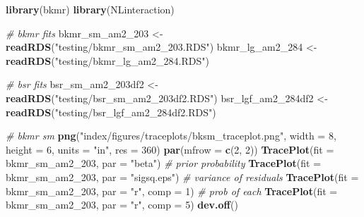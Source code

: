 \documentclass[12pt, twoside]{amherstthesis}
\newenvironment{Shaded}{\begin{snugshade}}{\end{snugshade}}
\newcommand{\AttributeTok}[1]{\textcolor[rgb]{0.13,0.29,0.53}{#1}}
\newcommand{\CommentTok}[1]{\textcolor[rgb]{0.56,0.35,0.01}{\textit{#1}}}
\newcommand{\DecValTok}[1]{\textcolor[rgb]{0.00,0.00,0.81}{#1}}
\newcommand{\FunctionTok}[1]{\textcolor[rgb]{0.13,0.29,0.53}{\textbf{#1}}}
\newcommand{\NormalTok}[1]{#1}
\newcommand{\OtherTok}[1]{\textcolor[rgb]{0.56,0.35,0.01}{#1}}
\newcommand{\StringTok}[1]{\textcolor[rgb]{0.31,0.60,0.02}{#1}}
\begin{document}
\scriptsize
\begin{Shaded}
\begin{Highlighting}[]
\FunctionTok{library}\NormalTok{(bkmr)}
\FunctionTok{library}\NormalTok{(NLinteraction)}

\CommentTok{\# bkmr fits}
\NormalTok{bkmr\_sm\_am2\_203 }\OtherTok{\textless{}{-}} \FunctionTok{readRDS}\NormalTok{(}\StringTok{"testing/bkmr\_sm\_am2\_203.RDS"}\NormalTok{)}
\NormalTok{bkmr\_lg\_am2\_284 }\OtherTok{\textless{}{-}} \FunctionTok{readRDS}\NormalTok{(}\StringTok{"testing/bkmr\_lg\_am2\_284.RDS"}\NormalTok{)}

\CommentTok{\# bsr fits}
\NormalTok{bsr\_sm\_am2\_203df2 }\OtherTok{\textless{}{-}} \FunctionTok{readRDS}\NormalTok{(}\StringTok{"testing/bsr\_sm\_am2\_203df2.RDS"}\NormalTok{)}
\NormalTok{bsr\_lgf\_am2\_284df2 }\OtherTok{\textless{}{-}} \FunctionTok{readRDS}\NormalTok{(}\StringTok{"testing/bsr\_lgf\_am2\_284df2.RDS"}\NormalTok{)}

\CommentTok{\# bkmr sm}
\FunctionTok{png}\NormalTok{(}\StringTok{"index/figures/traceplots/bksm\_traceplot.png"}\NormalTok{, }\AttributeTok{width =} \DecValTok{8}\NormalTok{, }\AttributeTok{height =} \DecValTok{6}\NormalTok{, }\AttributeTok{units =} \StringTok{"in"}\NormalTok{, }\AttributeTok{res =} \DecValTok{360}\NormalTok{)}
\FunctionTok{par}\NormalTok{(}\AttributeTok{mfrow =} \FunctionTok{c}\NormalTok{(}\DecValTok{2}\NormalTok{, }\DecValTok{2}\NormalTok{))}
\FunctionTok{TracePlot}\NormalTok{(}\AttributeTok{fit =}\NormalTok{ bkmr\_sm\_am2\_203, }\AttributeTok{par =} \StringTok{"beta"}\NormalTok{) }\CommentTok{\# prior probability}
\FunctionTok{TracePlot}\NormalTok{(}\AttributeTok{fit =}\NormalTok{ bkmr\_sm\_am2\_203, }\AttributeTok{par =} \StringTok{"sigsq.eps"}\NormalTok{) }\CommentTok{\# variance of residuals}
\FunctionTok{TracePlot}\NormalTok{(}\AttributeTok{fit =}\NormalTok{ bkmr\_sm\_am2\_203, }\AttributeTok{par =} \StringTok{"r"}\NormalTok{, }\AttributeTok{comp =} \DecValTok{1}\NormalTok{) }\CommentTok{\# prob of each}
\FunctionTok{TracePlot}\NormalTok{(}\AttributeTok{fit =}\NormalTok{ bkmr\_sm\_am2\_203, }\AttributeTok{par =} \StringTok{"r"}\NormalTok{, }\AttributeTok{comp =} \DecValTok{5}\NormalTok{)}
\FunctionTok{dev.off}\NormalTok{()}


\end{Highlighting}
\end{Shaded}
\end{document}
